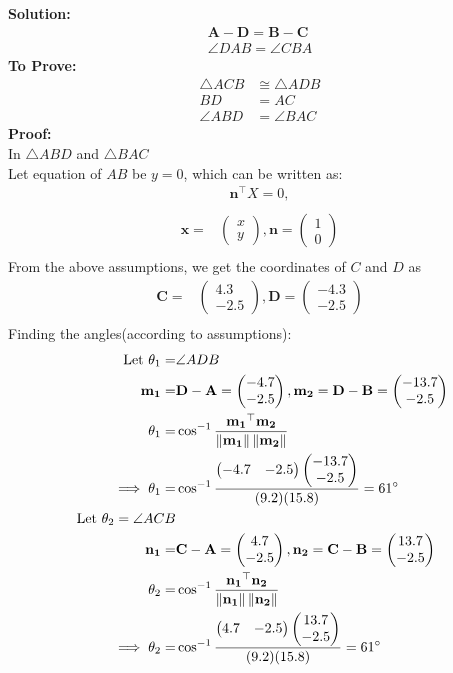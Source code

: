 \documentclass{article}
\providecommand{\norm}[1]{\left\lVert#1\right\rVert}
\newcommand{\solution}{\noindent \textbf{Solution: }}
\newcommand{\myvec}[1]{\ensuremath{\begin{pmatrix}#1\end{pmatrix}}}
\let\vec\mathbf
\begin{document}
\solution
\begin{align}
	\vec{A}-\vec{D} = \vec{B}-\vec{C}\\
  \angle{DAB} = \angle{CBA}
\end{align}
\textbf{To Prove:}
  \begin{align}
	  \triangle{ACB} &\cong \triangle{ADB}\\
	  BD &= AC\\
	  \angle{ABD} &= \angle{BAC}
  \end{align}
\textbf{Proof:}\\
In $\triangle{ABD}$ and $\triangle{BAC}$\\
Let  equation of $AB$ be $y = 0$, which can be written as:
\begin{align}
\vec{n}^{\top}X = 0,\\
\end{align}
\begin{align}
\vec{x} =& \myvec{x\\y},\vec{n} = \myvec{1\\0}\\
\end{align}
  From the above assumptions, we get the coordinates of $C$ and $D$ as
  \begin{align}
\vec{C} =& \myvec{4.3\\-2.5},\vec{D} = \myvec{-4.3\\-2.5}\\
  \end{align}
    Finding the angles(according to assumptions):
    \begin{align}
\text{Let }\theta_1=&\angle ADB\\
\vec{m_1}=&\vec{D}-\vec{A}=\myvec{-4.7\\-2.5}, \vec{m_2}=\vec{D}-\vec{B}=\myvec{-13.7\\-2.5}\\
\theta_1=&\cos^{-1}\frac{\vec{m_1}^\top\vec{m_2}}{\norm{\vec{m_1}}\norm{\vec{m_2}}}\\
\implies\theta_1=&\cos^{-1}\frac{\myvec{-4.7&-2.5}\myvec{-13.7\\-2.5}}{(9.2)(15.8)}=61\degree 
\label{eq:1}\\
\text{ Let }\theta_2=\angle ACB\\
\vec{n_1}=&\vec{C}-\vec{A}=\myvec{4.7\\-2.5}, \vec{n_2}=\vec{C}-\vec{B}=\myvec{13.7\\-2.5}\\
\theta_2 =& \cos^{-1}\frac{\vec{n_1}^\top\vec{n_2}}{\norm{\vec{n_1}}\norm{\vec{n_2}}}\\
\implies\theta_2=&\cos^{-1}\frac{\myvec{4.7&-2.5}\myvec{13.7\\-2.5}}{(9.2)(15.8)}=61\degree 
\label{eq:2}
\end{align}
\end{document}
